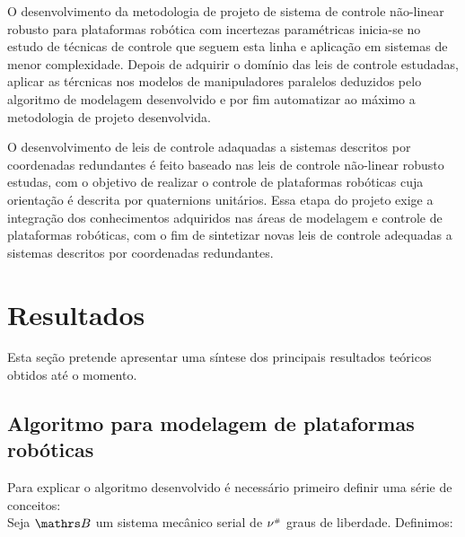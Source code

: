 \documentclass[a4paper,11pt,brazil,fleqn]{article}
\begin{document}
O desenvolvimento da metodologia de projeto de sistema de controle n\~ao-linear robusto para plataformas rob\'otica com incertezas param\'etricas inicia-se no estudo de t\'ecnicas de controle que seguem esta linha e aplica\c{c}\~ao em sistemas de menor complexidade. Depois de adquirir o dom\'inio das leis de controle estudadas, aplicar as t\'ercnicas nos modelos de manipuladores paralelos deduzidos pelo algoritmo de modelagem desenvolvido e por fim automatizar ao m\'aximo a metodologia de projeto desenvolvida.

O desenvolvimento de leis de controle adaquadas a sistemas descritos por coordenadas redundantes \'e feito baseado nas leis de controle n\~ao-linear robusto estudas, com o objetivo de realizar o controle de plataformas rob\'oticas cuja orienta\c{c}\~ao \'e descrita por quaternions unit\'arios. Essa etapa do projeto exige a integra\c{c}\~ao dos conhecimentos adquiridos nas \'areas de modelagem e controle de plataformas rob\'oticas, com o fim de sintetizar novas leis de controle adequadas a sistemas descritos por coordenadas redundantes.


\section{Resultados}\label{S04}

Esta se\c{c}\~ao pretende apresentar uma s\'intese dos principais resultados te\'oricos obtidos at\'e o momento.

\subsection{Algoritmo para modelagem de plataformas rob\'oticas}\label{S04-1}

Para explicar o algoritmo desenvolvido \'e necess\'ario primeiro definir uma s\'erie de conceitos: \\

Seja $\ssB$ um sistema mec\^anico serial de $\nu^{\scriptscriptstyle \#}$ graus de liberdade. Definimos:
\end{document}
